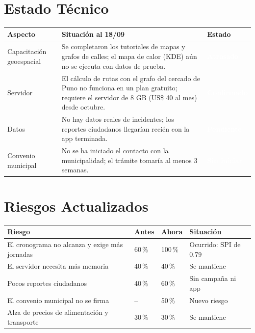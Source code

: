 \documentclass[11pt,a4paper]{article}
\newcommand{\etiqueta}[2]{{\setlength{\fboxsep}{2pt}\colorbox{#1}{\textcolor{white}{\scriptsize\bfseries #2}}}}
\begin{document}
\section{Estado Técnico}
{\small
{}
\noindent\begin{tabularx}{\textwidth}{@{}P{3.4cm} L C{1.9cm}@{}}
\toprule
{}
\textbf{Aspecto} & \textbf{Situación al 18/09} & \textbf{Estado} \\
\midrule
Capacitación geoespacial & Se completaron los tutoriales de mapas y grafos de calles; el mapa de calor (KDE) aún no se ejecuta con datos de prueba. & \etiqueta{SevAlta}{Atrasado} \\
Servidor & El cálculo de rutas con el grafo del cercado de Puno no funciona en un plan gratuito; requiere el servidor de 8 GB (US\$ 40 al mes) desde octubre. & \etiqueta{SevMedia}{Confirmado} \\
Datos & No hay datos reales de incidentes; los reportes ciudadanos llegarían recién con la app terminada. & \etiqueta{SevMedia}{Pendiente} \\
Convenio municipal & No se ha iniciado el contacto con la municipalidad; el trámite tomaría al menos 3 semanas. & \etiqueta{SevAlta}{Sin iniciar} \\
\bottomrule
\end{tabularx}
}

\section{Riesgos Actualizados}
{\small
{}
\noindent\begin{tabularx}{\textwidth}{@{}L C{1.3cm} C{1.3cm} P{3.3cm}@{}}
\toprule
{}
\textbf{Riesgo} & \textbf{Antes} & \textbf{Ahora} & \textbf{Situación} \\
\midrule
El cronograma no alcanza y exige más jornadas & 60\,\% & 100\,\% & Ocurrido: SPI de 0.79 \\
El servidor necesita más memoria & 40\,\% & 40\,\% & Se mantiene \\
Pocos reportes ciudadanos & 40\,\% & 60\,\% & Sin campaña ni app \\
El convenio municipal no se firma & -- & 50\,\% & Nuevo riesgo \\
Alza de precios de alimentación y transporte & 30\,\% & 30\,\% & Se mantiene \\
\bottomrule
\end{tabularx}
}
\end{document}
